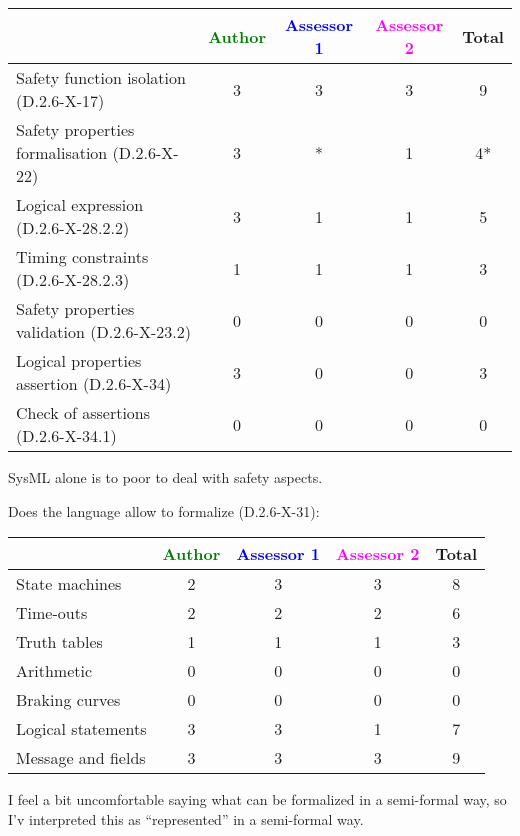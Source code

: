 \begin{tabular}{|l | c | c | c | c|}
\hline
& \textcolor{green}{Author} & \textcolor{blue}{Assessor 1} & \textcolor{magenta}{Assessor 2} & Total \\
\hline
Safety function isolation (D.2.6-X-17) & 3 & 3 & 3 & 9 \\
\hline
Safety properties formalisation (D.2.6-X-22) & 3 & * & 1 & 4* \\
\hline
Logical expression (D.2.6-X-28.2.2) & 3 & 1 & 1 & 5 \\
\hline
Timing constraints (D.2.6-X-28.2.3) & 1 & 1 & 1 & 3 \\
\hline
Safety properties validation (D.2.6-X-23.2) & 0 & 0 & 0 & 0 \\
\hline
Logical properties assertion (D.2.6-X-34) & 3 & 0 & 0 & 3 \\
\hline
Check of assertions (D.2.6-X-34.1) & 0 & 0 &  0 & 0 \\
\hline
\end{tabular}




\begin{assessor2}
SysML alone is to  poor to deal with safety aspects.
\end{assessor2}


Does the language allow to formalize (D.2.6-X-31):

\begin{tabular}{|l | c | c | c | c|}
\hline
& \textcolor{green}{Author} & \textcolor{blue}{Assessor 1} & \textcolor{magenta}{Assessor 2} & Total \\
\hline
State machines & 2 & 3 & 3 & 8 \\
\hline
Time-outs & 2 & 2 & 2 & 6 \\
\hline
Truth tables & 1 & 1 & 1 & 3 \\
\hline
Arithmetic & 0 & 0 & 0 & 0 \\
\hline
Braking curves & 0 & 0 & 0 & 0 \\
\hline
Logical statements & 3 & 3 & 1 & 7 \\
\hline
Message and fields & 3 & 3 & 3 & 9 \\
\hline
\end{tabular}

\begin{assessor1}
I feel a bit uncomfortable saying what can be formalized in a semi-formal way, so I'v interpreted this as "`represented"' in a semi-formal way. 
\end{assessor1}

